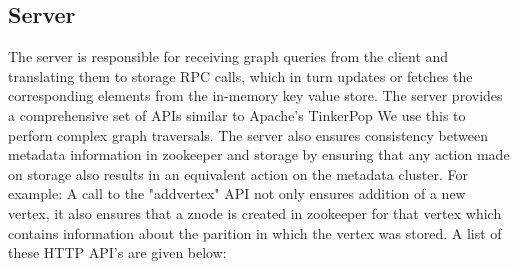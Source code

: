 \documentclass[letterpaper, 11 pt, conference]{ieeeconf}  %
\begin{document}
\subsection{Server} The server is responsible for receiving graph queries from the client and translating them to storage RPC calls, which in turn updates or fetches the corresponding elements from the in-memory key value store. The server provides a comprehensive set of APIs similar to Apache's TinkerPop\cite{tinkerpop} We use this to perforn complex graph traversals. The server also ensures consistency between metadata information in zookeeper and storage by ensuring that any action made on storage also results in an equivalent action on the metadata cluster. For example: A call to the "addvertex" API not only ensures addition of a new vertex, it also ensures that a znode is created in zookeeper for that vertex which contains information about the parition in which the vertex was stored. A list of these HTTP API's are given below:
\end{document}
